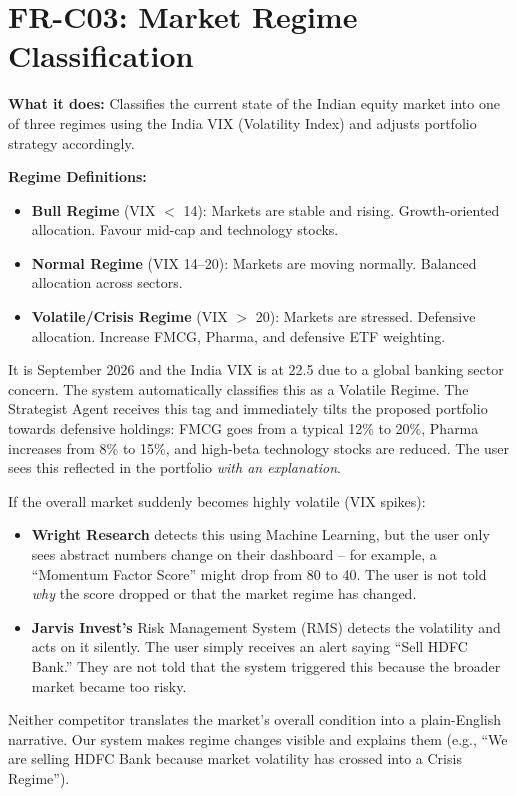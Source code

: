 \documentclass[12pt, a4paper, openany, oneside]{report}
\begin{document}
\section{FR-C03: Market Regime Classification}

\textbf{What it does:} Classifies the current state of the Indian equity market into one of three regimes using the India VIX (Volatility Index) and adjusts portfolio strategy accordingly.

\textbf{Regime Definitions:}
\begin{itemize}
  \item \textbf{Bull Regime} (VIX $<$ 14): Markets are stable and rising. Growth-oriented allocation. Favour mid-cap and technology stocks.
  \item \textbf{Normal Regime} (VIX 14--20): Markets are moving normally. Balanced allocation across sectors.
  \item \textbf{Volatile/Crisis Regime} (VIX $>$ 20): Markets are stressed. Defensive allocation. Increase FMCG, Pharma, and defensive ETF weighting.
\end{itemize}

\begin{examplebox}
It is September 2026 and the India VIX is at 22.5 due to a global banking sector concern. The system automatically classifies this as a Volatile Regime. The Strategist Agent receives this tag and immediately tilts the proposed portfolio towards defensive holdings: FMCG goes from a typical 12\% to 20\%, Pharma increases from 8\% to 15\%, and high-beta technology stocks are reduced. The user sees this reflected in the portfolio \textit{with an explanation}.
\end{examplebox}

\begin{gapbox}
If the overall market suddenly becomes highly volatile (VIX spikes):
\begin{itemize}[noitemsep]
  \item \textbf{Wright Research} detects this using Machine Learning, but the user only sees abstract numbers change on their dashboard -- for example, a ``Momentum Factor Score'' might drop from 80 to 40. The user is not told \textit{why} the score dropped or that the market regime has changed.
  \item \textbf{Jarvis Invest's} Risk Management System (RMS) detects the volatility and acts on it silently. The user simply receives an alert saying ``Sell HDFC Bank.'' They are not told that the system triggered this because the broader market became too risky.
\end{itemize}
Neither competitor translates the market's overall condition into a plain-English narrative. Our system makes regime changes visible and explains them (e.g., ``We are selling HDFC Bank because market volatility has crossed into a Crisis Regime'').
\end{gapbox}
\end{document}
